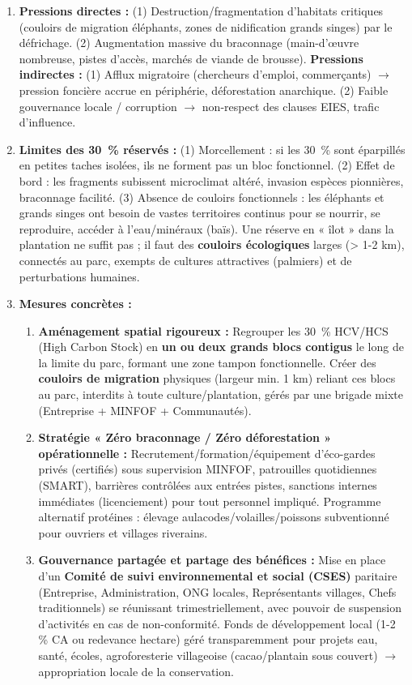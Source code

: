 \documentclass[11pt]{article}
\begin{document}
\begin{corrige}
\begin{enumerate}
    \item \textbf{Pressions directes :} (1) Destruction/fragmentation d'habitats critiques (couloirs de migration éléphants, zones de nidification grands singes) par le défrichage. (2) Augmentation massive du braconnage (main-d'œuvre nombreuse, pistes d'accès, marchés de viande de brousse). \textbf{Pressions indirectes :} (1) Afflux migratoire (chercheurs d'emploi, commerçants) $\rightarrow$ pression foncière accrue en périphérie, déforestation anarchique. (2) Faible gouvernance locale / corruption $\rightarrow$ non-respect des clauses EIES, trafic d'influence.
    \item \textbf{Limites des \SI{30}{\%} réservés :} (1) Morcellement : si les \SI{30}{\%} sont éparpillés en petites taches isolées, ils ne forment pas un bloc fonctionnel. (2) Effet de bord : les fragments subissent microclimat altéré, invasion espèces pionnières, braconnage facilité. (3) Absence de couloirs fonctionnels : les éléphants et grands singes ont besoin de vastes territoires continus pour se nourrir, se reproduire, accéder à l'eau/minéraux (baïs). Une réserve en « îlot » dans la plantation ne suffit pas ; il faut des \textbf{couloirs écologiques} larges (> 1-2 km), connectés au parc, exempts de cultures attractives (palmiers) et de perturbations humaines.
    \item \textbf{Mesures concrètes :}
    \begin{enumerate}
        \item \textbf{Aménagement spatial rigoureux :} Regrouper les \SI{30}{\%} HCV/HCS (High Carbon Stock) en \textbf{un ou deux grands blocs contigus} le long de la limite du parc, formant une zone tampon fonctionnelle. Créer des \textbf{couloirs de migration} physiques (largeur min. 1 km) reliant ces blocs au parc, interdits à toute culture/plantation, gérés par une brigade mixte (Entreprise + MINFOF + Communautés).
        \item \textbf{Stratégie « Zéro braconnage / Zéro déforestation » opérationnelle :} Recrutement/formation/équipement d'éco-gardes privés (certifiés) sous supervision MINFOF, patrouilles quotidiennes (SMART), barrières contrôlées aux entrées pistes, sanctions internes immédiates (licenciement) pour tout personnel impliqué. Programme alternatif protéines : élevage aulacodes/volailles/poissons subventionné pour ouvriers et villages riverains.
        \item \textbf{Gouvernance partagée et partage des bénéfices :} Mise en place d'un \textbf{Comité de suivi environnemental et social (CSES)} paritaire (Entreprise, Administration, ONG locales, Représentants villages, Chefs traditionnels) se réunissant trimestriellement, avec pouvoir de suspension d'activités en cas de non-conformité. Fonds de développement local (1-2 \% CA ou redevance hectare) géré transparemment pour projets eau, santé, écoles, agroforesterie villageoise (cacao/plantain sous couvert) $\rightarrow$ appropriation locale de la conservation.

\end{enumerate}
\end{enumerate}
\end{corrige}
\end{document}
